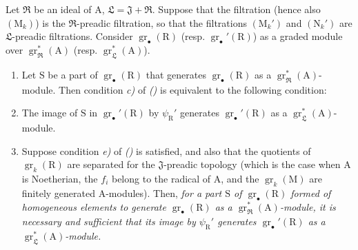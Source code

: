 \begin{corollary}[19.6.4]
\label{IV.19.6.4}
Let $\mathfrak{R}$ be an ideal of $\mathrm{A}$, $\mathfrak{L}=\mathfrak{J}+\mathfrak{R}$. Suppose that the filtration (hence also $(\mathrm{M}_k)$) is the $\mathfrak{R}$-preadic filtration, so that the filtrations $(\mathrm{M}_k')$ and $(\mathrm{N}_k')$ are $\mathfrak{L}$-preadic filtrations. Consider $\operatorname{gr}_\bullet(\mathrm{R})$ (resp. $\operatorname{gr}_\bullet'(\mathrm{R})$) as a graded module over $\operatorname{gr}_\mathfrak{R}^*(\mathrm{A})$ (resp. $\operatorname{gr}_\mathfrak{L}^*(\mathrm{A})$).
\begin{enumerate}
\item[\rm(i)] Let $\mathrm{S}$ be a part of $\operatorname{gr}_\bullet(\mathrm{R})$ that generates $\operatorname{gr}_\bullet(\mathrm{R})$ as a $\operatorname{gr}_\mathfrak{R}^*(\mathrm{A})$-module. Then condition \emph{c)} of \emph{()} is equivalent to the following condition:
\item[\rm c$'$)] The image of $\mathrm{S}$ in $\operatorname{gr}_\bullet'(\mathrm{R})$ by $\psi_\mathrm{R}'$ generates $\operatorname{gr}_\bullet'(\mathrm{R})$ as a $\operatorname{gr}_\mathfrak{L}^*(\mathrm{A})$-module.
\item[\rm(ii)] Suppose condition \emph{e)} of \emph{()} is satisfied, and also that the quotients of $\operatorname{gr}_k(\mathrm{R})$ are separated for the $\mathfrak{J}$-preadic topology (which is the case when $\mathrm{A}$ is Noetherian, the $f_i$ belong to the radical of $\mathrm{A}$, and the $\operatorname{gr}_k(\mathrm{M})$ are finitely generated $\mathrm{A}$-modules). Then, \emph{for a part $\mathrm{S}$ of $\operatorname{gr}_\bullet(\mathrm{R})$ formed of homogeneous elements to generate $\operatorname{gr}_\bullet(\mathrm{R})$ as a $\operatorname{gr}_\mathfrak{R}^*(\mathrm{A})$-module, it is necessary and sufficient that its image by $\psi_\mathrm{R}'$ generates $\operatorname{gr}_\bullet'(\mathrm{R})$ as a $\operatorname{gr}_\mathfrak{L}^*(\mathrm{A})$-module.}
\end{enumerate}
\end{corollary}

